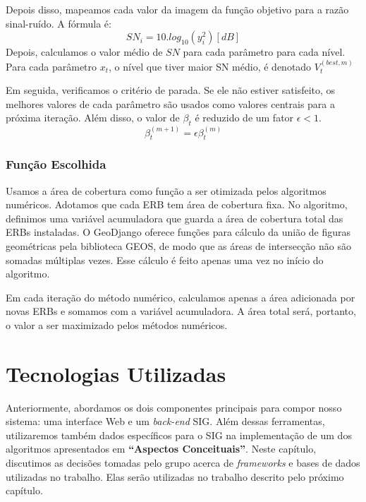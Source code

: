 \documentclass[]{politex}
\begin{document}
Depois disso, mapeamos cada valor da imagem da função objetivo para a razão
sinal-ruído. A fórmula é:
\begin{equation*}
    SN_i = 10.log_{10}(y_i^2) [dB]
\end{equation*}
Depois, calculamos o valor médio de $SN$ para cada parâmetro para cada nível.
Para cada parâmetro $x_t$, o nível que tiver maior SN médio, é denotado
$V_t^{(best, m)}$

Em seguida, verificamos o critério de parada. Se ele não estiver satisfeito, os
melhores valores de cada parâmetro são usados como valores centrais para a
próxima iteração. Além disso, o valor de $\beta_t$ é reduzido de um fator $\epsilon < 1$.
\begin{equation*}
    \beta_t^{(m+1)} = \epsilon\beta_t^{(m)}
\end{equation*}

\subsection{Função Escolhida}
Usamos a área de cobertura como função a ser otimizada pelos algoritmos
numéricos. Adotamos que cada ERB tem área de cobertura fixa.
No algoritmo, definimos uma variável acumuladora que guarda a área de cobertura
total das ERBs instaladas. O GeoDjango oferece funções para cálculo da união
de figuras geométricas pela biblioteca GEOS, de modo que as áreas de intersecção
não são somadas múltiplas vezes. Esse cálculo é feito apenas uma vez no início
do algoritmo.

Em cada iteração do método numérico, calculamos apenas a área adicionada por
novas ERBs e somamos com a variável acumuladora. A área total será, portanto, o
valor a ser maximizado pelos métodos numéricos.


\chapter{Tecnologias Utilizadas}

Anteriormente, abordamos os dois componentes principais para compor nosso
sistema: uma interface Web e um \textit{back-end} SIG. Além dessas ferramentas, utilizaremos
também dados específicos para o SIG na implementação de um dos algoritmos
apresentados em \textbf{``Aspectos Conceituais''}. Neste capítulo, discutimos as
decisões tomadas pelo grupo acerca de \emph{frameworks} e bases de dados
utilizadas no trabalho. Elas serão utilizadas no trabalho descrito pelo próximo
capítulo.
\end{document}
